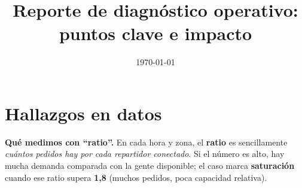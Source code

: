 \documentclass[11pt,a4paper]{article}
\title{\textbf{Reporte de diagnóstico operativo: puntos clave e impacto}}
\author{}
\date{\normalsize\today}
\begin{document}
\maketitle
\vspace{-0.5em}

\section*{Hallazgos en datos}

\noindent\textbf{Qué medimos con ``ratio''.} En cada hora y zona, el \textbf{ratio} es sencillamente \emph{cuántos pedidos hay por cada repartidor conectado}. Si el número es alto, hay mucha demanda comparada con la gente disponible; el caso marca \textbf{saturación} cuando ese ratio supera \textbf{1{,}8} (muchos pedidos, poca capacidad relativa).
\end{document}
